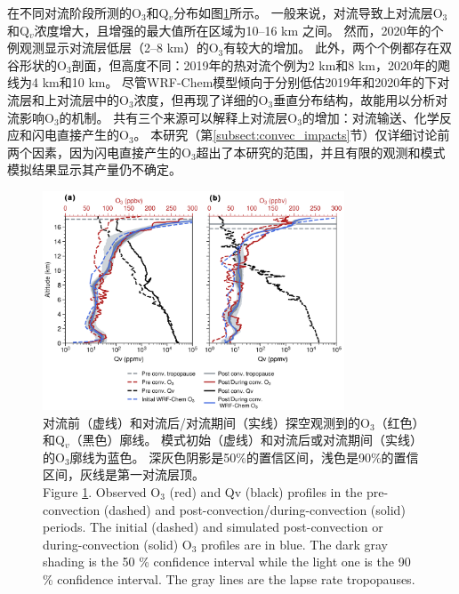 在不同对流阶段所测的O$_3$和Q$_v$分布如图\ref{fig:ozonesonde_profile}所示。
一般来说，对流导致上对流层O$_3$和Q$_v$浓度增大，且增强的最大值所在区域为10--16 km 之间。
然而，2020年的个例观测显示对流层低层（2--8 km）的O$_3$有较大的增加。
此外，两个个例都存在双谷形状的O$_3$剖面，但高度不同：2019年的热对流个例为2 km和8 km，2020年的飑线为4 km和10 km。
尽管WRF-Chem模型倾向于分别低估2019年和2020年的下对流层和上对流层中的O$_3$浓度，但再现了详细的O$_3$垂直分布结构，故能用以分析对流影响O$_3$的机制。
共有三个来源可以解释上对流层O$_3$的增加：对流输送、化学反应和闪电直接产生的O$_3$。
本研究（第\ref{subsect:convec_impacts}节）仅详细讨论前两个因素，因为闪电直接产生的O$_3$超出了本研究的范围，并且有限的观测和模式模拟结果显示其产量仍不确定\citep{Morris.2010,Ripoll.2014}。


\begin{figure}[!htbp]
\centering
\includegraphics[width=0.8\textwidth]{./figures/ozonesonde_profile.png}
\caption{对流前（虚线）和对流后/对流期间（实线）探空观测到的O$_3$（红色）和Q$_v$（黑色）廓线。
模式初始（虚线）和对流后或对流期间（实线）的O$_3$廓线为蓝色。
深灰色阴影是50\%的置信区间，浅色是90\%的置信区间，灰线是第一对流层顶。\\
Figure \ref{fig:ozonesonde_profile}. Observed O$_3$ (red) and Qv (black) profiles in the pre-convection (dashed) and post-convection/during-convection (solid) periods.
The initial (dashed) and simulated post-convection or during-convection (solid) O$_3$ profiles are in blue.
The dark gray shading is the 50 \% confidence interval while the light one is the 90 \% confidence interval.
The gray lines are the lapse rate tropopauses.
}
\label{fig:ozonesonde_profile}
\end{figure}


